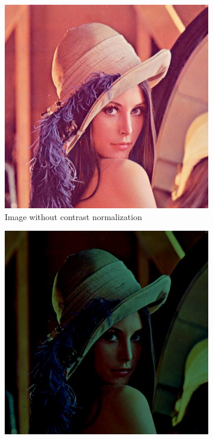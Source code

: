\documentclass{article} %
\begin{document}
\begin{figure}
\begin{subfigure}{0.33\textwidth}
\centering
\includegraphics[scale=0.2]{images/lena}
\caption{Image without contrast normalization}
\end{subfigure}
\begin{subfigure}{0.33\textwidth}
\centering
\includegraphics[scale=0.2]{images/lena_contrast}

\end{subfigure}
\end{figure}
\end{document}

